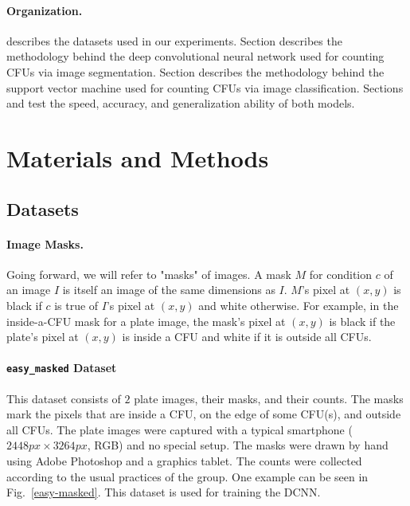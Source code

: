 \documentclass[10pt,letterpaper]{article}
\begin{document}
    \paragraph*{Organization.}
        \textit{} describes the datasets used in our experiments. Section \textit{} describes the methodology behind the deep convolutional neural network used for counting CFUs via image segmentation. Section \textit{} describes the methodology behind the support vector machine used for counting CFUs via image classification. Sections \textit{} and \textit{} test the speed, accuracy, and generalization ability of both models.

\section*{Materials and Methods}
    \subsection*{Datasets} \label{ssec:datasets}
        \paragraph*{Image Masks.}
            Going forward, we will refer to "masks" of images. A mask $M$ for condition $c$ of an image $I$ is itself an image of the same dimensions as $I$. $M$'s pixel at $(x, y)$ is black if $c$ is true of $I$'s pixel at $(x, y)$ and white otherwise. For example, in the inside-a-CFU mask for a plate image, the mask's pixel at $(x, y)$ is black if the plate's pixel at $(x, y)$ is inside a CFU and white if it is outside all CFUs.

        \paragraph*{\texttt{easy\_masked} Dataset}
            This dataset consists of $2$ plate images, their masks, and their counts. The masks mark the pixels that are inside a CFU, on the edge of some CFU(s), and outside all CFUs. The plate images were captured with a typical smartphone ($2448px \times 3264px$, RGB) and no special setup. The masks were drawn by hand using Adobe Photoshop and a graphics tablet. The counts were collected according to the usual practices of the group. One example can be seen in Fig.~\ref{easy-masked}. This dataset is used for training the DCNN.
\end{document}
